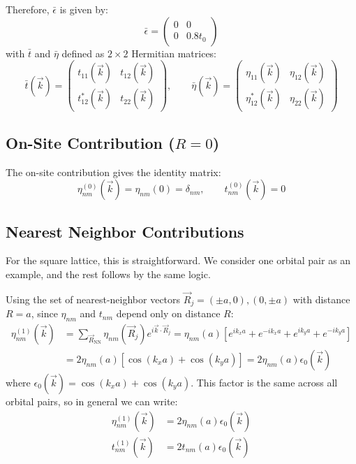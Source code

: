 \documentclass[11pt]{article}
\begin{document}
Therefore, $\bar{\epsilon}$ is given by:
\[
	\bar{\epsilon} = \begin{pmatrix}
		0 & 0 \\
		0 & 0.8t_{0}
	\end{pmatrix}
\]
with $\bar{t}$ and $\bar{\eta}$ defined as $2 \times 2$ Hermitian matrices:
\[
	\bar{t}(\vec{k}) = \begin{pmatrix}
	t_{11}(\vec{k}) & t_{12}(\vec{k}) \\
	t_{12}^*(\vec{k}) & t_{22}(\vec{k})
	\end{pmatrix}, \qquad
	\bar{\eta}(\vec{k}) = \begin{pmatrix}
	\eta_{11}(\vec{k})  & \eta_{12}(\vec{k}) \\
	\eta_{12}^*(\vec{k}) & \eta_{22}(\vec{k})
	\end{pmatrix}
\]

\subsection*{On-Site Contribution ($R = 0$)}

The on-site contribution gives the identity matrix:
\[
	\eta_{nm}^{(0)}(\vec{k}) = \eta_{nm}(0) = \delta_{nm}, \qquad t_{nm}^{(0)}(\vec{k}) = 0
\]

\subsection*{Nearest Neighbor Contributions}

For the square lattice, this is straightforward. We consider one orbital pair as an example, and the rest follows by the same logic. 

Using the set of nearest-neighbor vectors $\vec{R}_{j} = (\pm a, 0), (0, \pm a)$ with distance $R = a$, since $\eta_{nm}$ and $t_{nm}$ depend only on distance $R$:
\begin{align*}
	\eta^{(1)}_{nm}(\vec{k}) &= \sum_{\vec{R}_{\text{NN}}} \eta_{nm}(\vec{R}_{j}) e^{i \vec{k} \cdot \vec{R}_{j}} = \eta_{nm}(a) \left[ e^{i k_{x}a} + e^{-i k_{x}a} + e^{i k_{y}a} + e^{-i k_{y}a} \right] \\
	&= 2 \eta_{nm}(a) \left[\cos(k_{x}a) + \cos(k_{y}a)\right] = 2 \eta_{nm}(a) \epsilon_{0}(\vec{k})
\end{align*}
where $\epsilon_{0}(\vec{k}) = \cos(k_{x}a) + \cos(k_{y}a)$. This factor is the same across all orbital pairs, so in general we can write:
\begin{align*}
	\eta^{(1)}_{nm}(\vec{k}) &= 2 \eta_{nm}(a) \epsilon_{0}(\vec{k}) \\
	t^{(1)}_{nm}(\vec{k}) &= 2 t_{nm}(a) \epsilon_{0}(\vec{k})
\end{align*}
\end{document}
